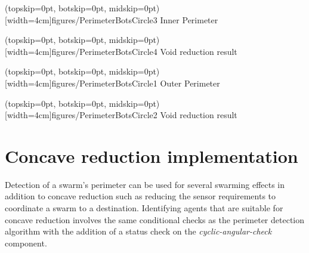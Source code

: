 \documentclass{ieeeaccess}
\begin{document}
\Figure[t!](topskip=0pt, botskip=0pt, midskip=0pt)[width=4cm]{figures/PerimeterBotsCircle3}
{Inner Perimeter\label{fig:InnerPerimeter2}}


\Figure[t!](topskip=0pt, botskip=0pt, midskip=0pt)[width=4cm]{figures/PerimeterBotsCircle4}
{Void reduction result\label{fig:InnerPerimeter3}}


\Figure[t!](topskip=0pt, botskip=0pt, midskip=0pt)[width=4cm]{figures/PerimeterBotsCircle1}
{Outer Perimeter\label{fig:OuterPerimeter2}}


\Figure[t!](topskip=0pt, botskip=0pt, midskip=0pt)[width=4cm]{figures/PerimeterBotsCircle2}
{Void reduction result\label{fig:OuterPerimeter3}}


\section{Concave reduction implementation}\label{sec:ConcaveReductionImp}
Detection of a swarm's perimeter can be used for several swarming effects in addition to concave reduction such as reducing the sensor requirements to coordinate a swarm to a destination. Identifying agents that are suitable for concave reduction involves the same conditional checks as the perimeter detection algorithm with the addition of a status check on the \textit{cyclic-angular-check} component. 
\end{document}
